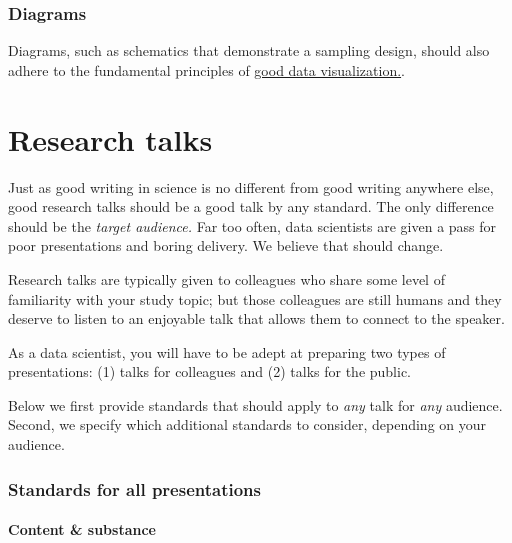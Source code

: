 \documentclass[]{book}
\begin{document}
\hypertarget{diagrams}{%
\subsection*{Diagrams}\label{diagrams}}

Diagrams, such as schematics that demonstrate a sampling design, should also adhere to the fundamental principles of \protect\hyperlink{datavis}{good data visualization.}.

\hypertarget{research-talks}{%
\chapter{Research talks}\label{research-talks}}

Just as good writing in science is no different from good writing anywhere else, good research talks should be a good talk by any standard. The only difference should be the \emph{target audience.} Far too often, data scientists are given a pass for poor presentations and boring delivery. We believe that should change.

Research talks are typically given to colleagues who share some level of familiarity with your study topic; but those colleagues are still humans and they deserve to listen to an enjoyable talk that allows them to connect to the speaker.

As a data scientist, you will have to be adept at preparing two types of presentations: (1) talks for colleagues and (2) talks for the public.

Below we first provide standards that should apply to \emph{any} talk for \emph{any} audience. Second, we specify which additional standards to consider, depending on your audience.

\hypertarget{standards-for-all-presentations}{%
\subsection*{Standards for all presentations}\label{standards-for-all-presentations}}

\hypertarget{content-substance}{%
\subsubsection*{Content \& substance}\label{content-substance}}
\end{document}
